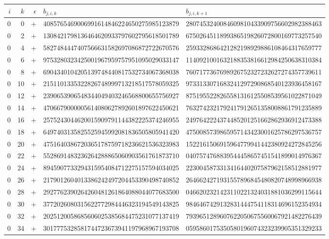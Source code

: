 \begin{longtable}{rrrll}
$i$ & $k$ & $\epsilon$ & $b_{j,i,k}$ & $b_{j,i,k+1}$ \\ \hline\endhead
0 & 0 & + & 4085765469006991614846224650275985123879 & 2807453240084609810433909756602982388463 \\
0 & 2 & + & 1308421798136464620933797602795618501789 & 6750264511899386519826072800169773257540 \\
0 & 4 & + & 5827484447407566631582697086872722670576 & 2593328686421282198929886108464317659777 \\
0 & 6 & + & 9753280323425001967959757951095029033147 & 1140921001632188353816612984250638310384 \\
0 & 8 & + & 6904340104205139748440817532734067368038 & 7607177367698926752327232627274357739611 \\
0 & 10 & + & 2151101335322826748999713218517578059325 & 9733133071683241297290868540123936458167 \\
0 & 12 & + & 2390653906548344049403246568800655756927 & 8751955228265581316125508539561022871049 \\
0 & 14 & + & 4706679000005614080627892601897622450621 & 7632742321792417912651358008861791235889 \\
0 & 16 & + & 2575243044620015909791144382225374246955 & 2497642224374485201251662862936912473388 \\
0 & 18 & + & 6497403135825525945992081836505805941420 & 4750085739865957143423001625786297536757 \\
0 & 20 & + & 4751640386720365178759718236621536323983 & 1522161506915964779941442380924272845256 \\
0 & 22 & + & 5528691483236264288865060903561761873710 & 0407574768839544458657451541899014976367 \\
0 & 24 & + & 8945907733294315954084712275157594034025 & 2230045873313416440207587962158512881977 \\
0 & 26 & + & 2179012604013386242497204453390498740852 & 2646624271931557896845480820748998966938 \\
0 & 28 & + & 2927762390264260481261864088044077683500 & 0466202321423110221324031881036299115644 \\
0 & 30 & + & 3772026080315622772984446323194549143825 & 9846467429132831444754118314696152354934 \\
0 & 32 & + & 2025120058685606025385684475231077137419 & 7939651289607622050675560067921482276439 \\
0 & 34 & + & 3017775328581744723673941197968967193708 & 0595860175350580196074323239905351329233 \\

\end{longtable}
